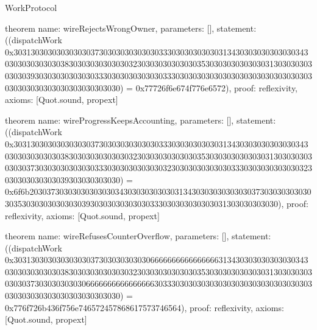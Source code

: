 \begin{lexlean}{WorkProtocol}
\begin{semanticmodule}
theorem{
  name: wireRejectsWrongOwner,
  parameters: [],
  statement: ((dispatchWork 0x303130303030303030373030303030303033303030303030313430303030303030343030303030303038303030303030303230303030303030353030303030303031303030303030303930303030303030333030303030303033303030303030303030303030303030303030303030303030303030303030) = 0x77726f6e674f776e6572),
  proof: reflexivity{},
  axioms: [Quot.sound, propext]
}

theorem{
  name: wireProgressKeepsAccounting,
  parameters: [],
  statement: ((dispatchWork 0x303130303030303030373030303030303033303030303030313430303030303030343030303030303038303030303030303230303030303030353030303030303031303030303030303730303030303030333030303030303032303030303030303330303030303030323030303030303039303030303030) = 0x6f6b2030373030303030303034303030303030313430303030303030373030303030303035303030303030303930303030303030333030303030303031303030303030),
  proof: reflexivity{},
  axioms: [Quot.sound, propext]
}

theorem{
  name: wireRefusesCounterOverflow,
  parameters: [],
  statement: ((dispatchWork 0x303130303030303030373030303030306666666666666666313430303030303030343030303030303038303030303030303230303030303030353030303030303031303030303030303730303030303066666666666666663033303030303030303030303030303030303030303030303030303030303030) = 0x776f726b436f756e746572457868617573746564),
  proof: reflexivity{},
  axioms: [Quot.sound, propext]
}
\end{semanticmodule}
\end{lexlean}
